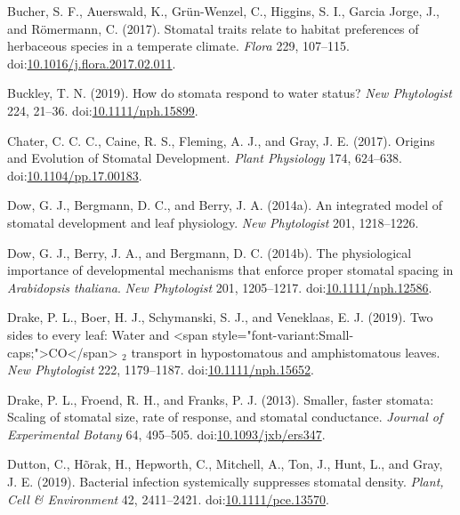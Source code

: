 \documentclass[utf8]{frontiersSCNS}
\begin{document}
\leavevmode\hypertarget{ref-bucher_stomatal_2017}{}%
Bucher, S. F., Auerswald, K., Grün-Wenzel, C., Higgins, S. I., Garcia
Jorge, J., and Römermann, C. (2017). Stomatal traits relate to habitat
preferences of herbaceous species in a temperate climate. \emph{Flora}
229, 107--115.
doi:\href{https://doi.org/10.1016/j.flora.2017.02.011}{10.1016/j.flora.2017.02.011}.

\leavevmode\hypertarget{ref-buckley_how_2019}{}%
Buckley, T. N. (2019). How do stomata respond to water status? \emph{New
Phytologist} 224, 21--36.
doi:\href{https://doi.org/10.1111/nph.15899}{10.1111/nph.15899}.

\leavevmode\hypertarget{ref-chater_origins_2017}{}%
Chater, C. C. C., Caine, R. S., Fleming, A. J., and Gray, J. E. (2017).
Origins and Evolution of Stomatal Development. \emph{Plant Physiology}
174, 624--638.
doi:\href{https://doi.org/10.1104/pp.17.00183}{10.1104/pp.17.00183}.

\leavevmode\hypertarget{ref-dow_integrated_2014}{}%
Dow, G. J., Bergmann, D. C., and Berry, J. A. (2014a). An integrated
model of stomatal development and leaf physiology. \emph{New
Phytologist} 201, 1218--1226.

\leavevmode\hypertarget{ref-dow_physiological_2014}{}%
Dow, G. J., Berry, J. A., and Bergmann, D. C. (2014b). The physiological
importance of developmental mechanisms that enforce proper stomatal
spacing in \emph{Arabidopsis thaliana}. \emph{New Phytologist} 201,
1205--1217.
doi:\href{https://doi.org/10.1111/nph.12586}{10.1111/nph.12586}.

\leavevmode\hypertarget{ref-drake_two_2019}{}%
Drake, P. L., Boer, H. J., Schymanski, S. J., and Veneklaas, E. J.
(2019). Two sides to every leaf: Water and \textless span
style="font-variant:Small-caps;"\textgreater CO\textless/span\textgreater{}
\(_{\textrm{2}}\) transport in hypostomatous and amphistomatous leaves.
\emph{New Phytologist} 222, 1179--1187.
doi:\href{https://doi.org/10.1111/nph.15652}{10.1111/nph.15652}.

\leavevmode\hypertarget{ref-drake_smaller_2013}{}%
Drake, P. L., Froend, R. H., and Franks, P. J. (2013). Smaller, faster
stomata: Scaling of stomatal size, rate of response, and stomatal
conductance. \emph{Journal of Experimental Botany} 64, 495--505.
doi:\href{https://doi.org/10.1093/jxb/ers347}{10.1093/jxb/ers347}.

\leavevmode\hypertarget{ref-dutton_bacterial_2019}{}%
Dutton, C., Hõrak, H., Hepworth, C., Mitchell, A., Ton, J., Hunt, L.,
and Gray, J. E. (2019). Bacterial infection systemically suppresses
stomatal density. \emph{Plant, Cell \& Environment} 42, 2411--2421.
doi:\href{https://doi.org/10.1111/pce.13570}{10.1111/pce.13570}.
\end{document}
